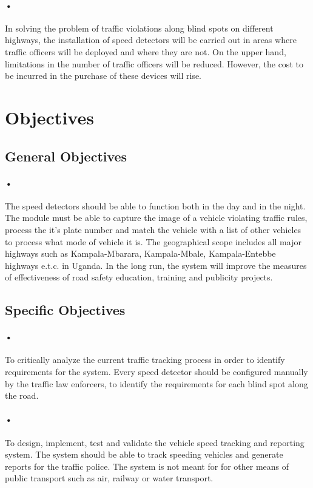 \documentclass[12pt]{report}
\begin{document}
\paragraph{•}
In solving the problem of traffic violations along blind spots on different highways, the installation of speed detectors will be carried out in areas where traffic officers will be deployed and where they are not. On the upper hand, limitations in the number of traffic officers will be reduced. However, the cost to be incurred in the purchase of these devices will rise. 

\section{Objectives}
\subsection{General Objectives}
\paragraph{•}
The speed detectors should be able to function both in the day and in the night. The module must be able to capture the image of a vehicle violating traffic rules, process the it's plate number and match the vehicle with a list of other vehicles to process what mode of vehicle it is. The geographical scope includes all major highways such as Kampala-Mbarara, Kampala-Mbale, Kampala-Entebbe highways e.t.c. in Uganda. In the long run, the system will improve the measures of effectiveness of road safety education, training and publicity projects.
\subsection{Specific Objectives}
\paragraph{•}
To critically analyze the current traffic tracking process in order to identify requirements for the system. Every speed detector should be configured manually by the traffic law enforcers, to identify the requirements for each blind spot along the road.
\paragraph{•}
To design, implement, test and validate the vehicle speed tracking and reporting system. The system should be able to track speeding vehicles and generate reports for the traffic police.
The system is not meant for for other means of public transport such as air, railway or water transport.
\end{document}
